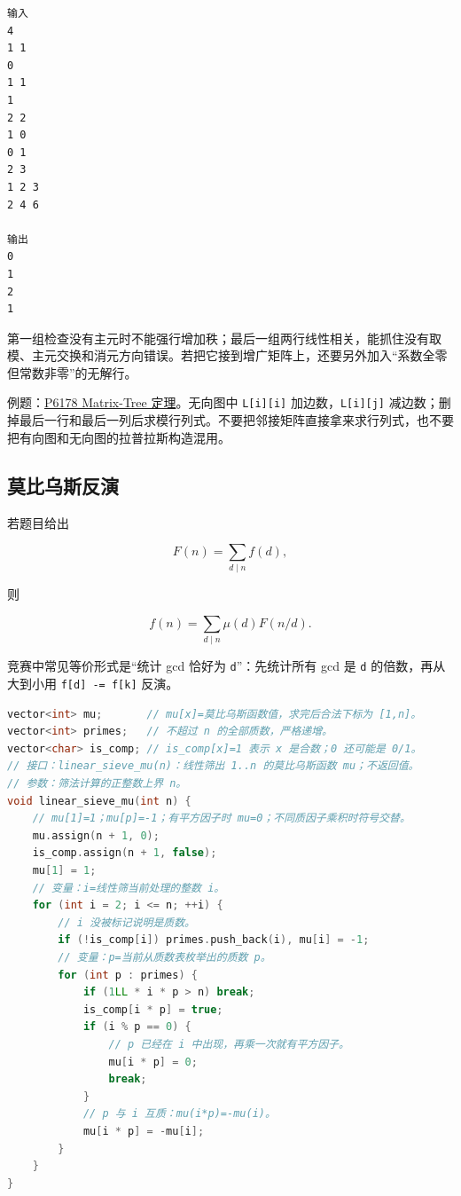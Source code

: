 \begin{lstlisting}
输入
4
1 1
0
1 1
1
2 2
1 0
0 1
2 3
1 2 3
2 4 6

输出
0
1
2
1
\end{lstlisting}

第一组检查没有主元时不能强行增加秩；最后一组两行线性相关，能抓住没有取模、主元交换和消元方向错误。若把它接到增广矩阵上，还要另外加入``系数全零但常数非零''的无解行。

例题：\href{https://www.luogu.com.cn/problem/P6178}{P6178 Matrix-Tree 定理}。无向图中 \passthrough{\lstinline!L[i][i]!} 加边数，\passthrough{\lstinline!L[i][j]!} 减边数；删掉最后一行和最后一列后求模行列式。不要把邻接矩阵直接拿来求行列式，也不要把有向图和无向图的拉普拉斯构造混用。


\subsection{莫比乌斯反演}

若题目给出

\[F(n)=\sum_{d\mid n} f(d),\]

则

\[f(n)=\sum_{d\mid n}\mu(d)F(n/d).\]

竞赛中常见等价形式是``统计 gcd 恰好为 \passthrough{\lstinline!d!}''：先统计所有 gcd 是 \passthrough{\lstinline!d!} 的倍数，再从大到小用 \passthrough{\lstinline!f[d] -= f[k]!} 反演。

\begin{lstlisting}[language={C++}]
vector<int> mu;       // mu[x]=莫比乌斯函数值，求完后合法下标为 [1,n]。
vector<int> primes;   // 不超过 n 的全部质数，严格递增。
vector<char> is_comp; // is_comp[x]=1 表示 x 是合数；0 还可能是 0/1。
// 接口：linear_sieve_mu(n)：线性筛出 1..n 的莫比乌斯函数 mu；不返回值。
// 参数：筛法计算的正整数上界 n。
void linear_sieve_mu(int n) {
    // mu[1]=1；mu[p]=-1；有平方因子时 mu=0；不同质因子乘积时符号交替。
    mu.assign(n + 1, 0);
    is_comp.assign(n + 1, false);
    mu[1] = 1;
    // 变量：i=线性筛当前处理的整数 i。
    for (int i = 2; i <= n; ++i) {
        // i 没被标记说明是质数。
        if (!is_comp[i]) primes.push_back(i), mu[i] = -1;
        // 变量：p=当前从质数表枚举出的质数 p。
        for (int p : primes) {
            if (1LL * i * p > n) break;
            is_comp[i * p] = true;
            if (i % p == 0) {
                // p 已经在 i 中出现，再乘一次就有平方因子。
                mu[i * p] = 0;
                break;
            }
            // p 与 i 互质：mu(i*p)=-mu(i)。
            mu[i * p] = -mu[i];
        }
    }
}
\end{lstlisting}

